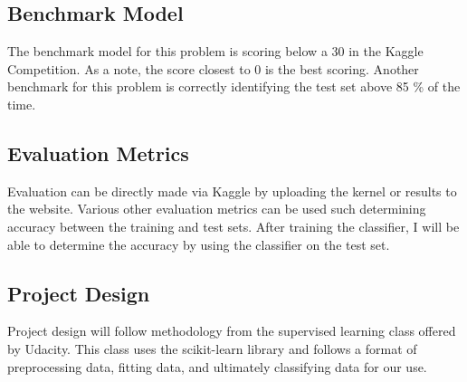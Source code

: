 \documentclass{article}
\begin{document}
\subsection{Benchmark Model}
The benchmark model for this problem is scoring below a 30 in the Kaggle Competition. As a note, the score closest to 0 is the best scoring. Another benchmark for this problem is correctly identifying the test set above 85 \% of the time. 

\subsection{Evaluation Metrics}
Evaluation can be directly made via Kaggle by uploading the kernel or results to the website. Various other evaluation metrics can be used such determining accuracy between the training and test sets. After training the classifier, I will be able to determine the accuracy by using the classifier on the test set.

\subsection{Project Design}
Project design will follow methodology from the supervised learning class offered by Udacity. This class uses the scikit-learn library and follows a format of preprocessing data, fitting data, and ultimately classifying data for our use.
\end{document}
